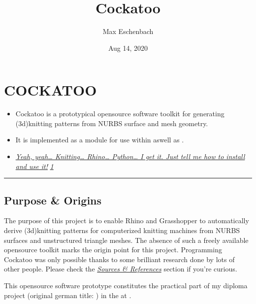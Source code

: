 \documentclass[letterpaper,10pt,english]{sphinxmanual}
\title{Cockatoo}
\date{Aug 14, 2020}
\author{Max Eschenbach}
\begin{document}
\pagestyle{empty}
\sphinxmaketitle
\pagestyle{plain}
\sphinxtableofcontents
\pagestyle{normal}
\label{\detokenize{index::doc}}



\chapter{COCKATOO}
\label{\detokenize{README:cockatoo}}\label{\detokenize{README::doc}}
\begin{itemize}
\item {} 
Cockatoo is a prototypical open\sphinxhyphen{}source software toolkit for
generating (3d\sphinxhyphen{})knitting patterns from NURBS surface and mesh
geometry.

\item {} 
It is implemented as a  module
for use within 
aswell as
.

\item {} 
{\hyperref[\detokenize{README:installation}]{\emph{Yeah, yeah… Knitting… Rhino… Python… I get it. Just tell me
how to install and use it!}}} {\hyperref[\detokenize{README:misc}]{\emph{1}}}

\end{itemize}


\bigskip\hrule\bigskip



\section{Purpose \& Origins}
\label{\detokenize{README:purpose-origins}}\label{\detokenize{README:id1}}
The purpose of this project is to enable Rhino and Grasshopper to
automatically derive (3d\sphinxhyphen{})knitting patterns for computerized knitting
machines from NURBS surfaces and unstructured triangle meshes. The
absence of such a freely available open\sphinxhyphen{}source toolkit marks the origin
point for this project. Programming Cockatoo was only possible thanks to
some brilliant research done by lots of other people. Please check the
{\hyperref[\detokenize{README:sources--references}]{\emph{Sources \& References}}} section if you’re
curious.

This open\sphinxhyphen{}source software prototype constitutes the practical part of my
diploma project  (original german title: ) in the  at
.
\end{document}
